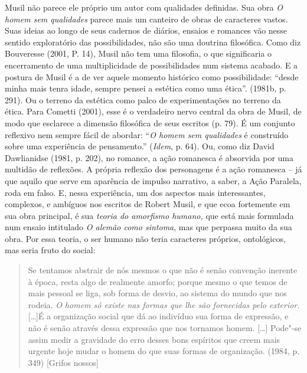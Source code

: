 Musil não parece ele próprio um autor com qualidades definidas. Sua obra
\emph{O homem sem qualidades} parece mais um canteiro de obras de
caracteres vastos. Suas ideias ao longo de seus cadernos de diários,
ensaios e romances vão nesse sentido exploratório das possibilidades,
não são uma doutrina filosófica. Como diz Bouveresse (2001, P. 14),
Musil não tem uma filosofia, o que significaria o encerramento de uma
multiplicidade de possibilidades num sistema acabado. E a postura de
Musil é a de ver aquele momento histórico como possibilidade: ``desde
minha mais tenra idade, sempre pensei a estética como uma ética''.
(1981b, p. 291). Ou o terreno da estética como palco de experimentações
no terreno da ética. Para Cometti (2001), esse é o verdadeiro nervo
central da obra de Musil, de modo que esclarece a dimensão filosófica de
seus escritos (p. 79). É um conjunto reflexivo nem sempre fácil de
abordar: ``\emph{O homem sem qualidades} é construído sobre uma
experiência de pensamento.'' (\emph{Idem}, p. 64). Ou, como diz David
Dawlianidse (1981, p. 202), no romance, a ação romanesca é absorvida por
uma multidão de reflexões. A própria reflexão dos personagens é a ação
romanesca -- já que aquilo que serve em aparência de impulso narrativo,
a saber, a Ação Paralela, roda em falso. E, nessa experiência, um dos
aspectos mais interessantes, complexos, e ambíguos nos escritos de
Robert Musil, e que ecoa fortemente em sua obra principal, é sua
\emph{teoria do amorfismo humano,} que está mais formulada num ensaio
intitulado \emph{O alemão como sintoma}, mas que perpassa muito da sua
obra. Por essa teoria, o ser humano não teria caracteres próprios,
ontológicos, mas seria fruto do social:

\begin{quote}
Se tentamos abstrair de nós mesmos o que não é senão convenção inerente
à época, resta algo de realmente amorfo; porque mesmo o que temos de
mais pessoal se liga, sob forma de desvio, ao sistema do mundo que nos
rodeia. \emph{O homem só existe nas formas que lhe são fornecidas pelo
exterior.} [\ldots{}]É a organização social que dá ao indivíduo sua forma
de expressão, e não é senão através dessa expressão que nos tornamos
homem. [\ldots{}] Pode"-se assim medir a gravidade do erro desses
bons espíritos que creem mais urgente hoje mudar o homem do que suas
formas de organização. (1984, p. 349) [Grifos nossos]
\end{quote}

